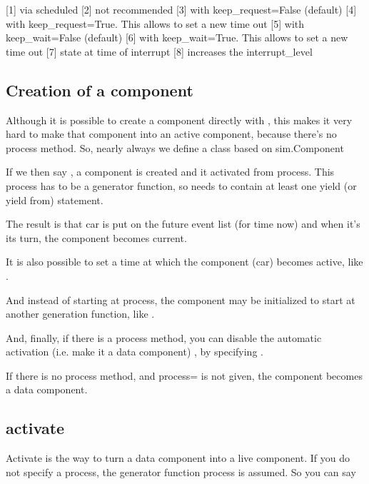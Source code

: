 \documentclass[letterpaper,10pt,english]{sphinxmanual}
\begin{document}
{[}1{]} via scheduled 
{[}2{]} not recommended 
{[}3{]} with keep\_request=False (default) 
{[}4{]} with keep\_request=True. This allows to set a new time out 
{[}5{]} with keep\_wait=False (default) 
{[}6{]} with keep\_wait=True. This allows to set a new time out 
{[}7{]} state at time of interrupt 
{[}8{]} increases the interrupt\_level 


\subsection{Creation of a component}
\label{\detokenize{Component:creation-of-a-component}}
Although it is possible to create a component directly with , this
makes it very hard to make that component into an active component,
because there’s no process method. So, nearly always we define a class based on
sim.Component

\begin{sphinxVerbatim}[commandchars=\\\{\}]
 
     
\end{sphinxVerbatim}

If we then say , a component is created and it activated from process. This
process has to be a generator function, so needs to contain at least one yield (or yield from) statement.

The result is that car is put on the future event list (for time now) and when it’s its
turn, the component becomes current.

It is also possible to set a time at which the component (car) becomes active, like .

And instead of starting at process, the component may be initialized to start at another generation function,
like .

And, finally, if there is a process method, you can disable the automatic activation (i.e.
make it a data component) , by specifying .

If there is no process method, and process= is not given, the component becomes a data component.


\subsection{activate}
\label{\detokenize{Component:activate}}
Activate is the way to turn a data component into a live component. If you do not specify a process,
the generator function process is assumed. So you can say
\end{document}
